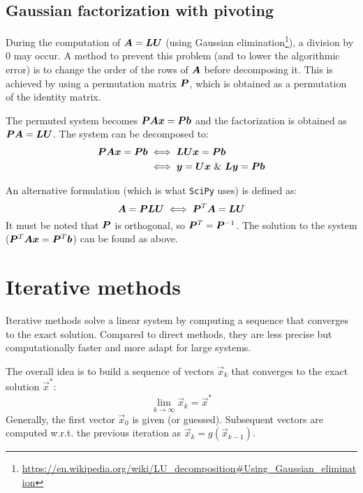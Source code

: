 \subsection{Gaussian factorization with pivoting}
During the computation of ${\bm{A}} = {\bm{L}}{\bm{U}}$ 
(using Gaussian elimination\footnote{\url{https://en.wikipedia.org/wiki/LU\_decomposition\#Using\_Gaussian\_elimination}}), 
a division by 0 may occur.
A method to prevent this problem (and to lower the algorithmic error) is to change the order of the rows of ${\bm{A}}$ before decomposing it.
This is achieved by using a permutation matrix ${\bm{P}}$, which is obtained as a permutation of the identity matrix.

The permuted system becomes ${\bm{P}}{\bm{A}}{\bm{x}} = {\bm{P}}{\bm{b}}$ and the factorization is obtained as ${\bm{P}}{\bm{A}} = {\bm{L}}{\bm{U}}$.
The system can be decomposed to:
\[
    \begin{split}
        {\bm{P}}{\bm{A}}{\bm{x}} = {\bm{P}}{\bm{b}} & \iff {\bm{L}}{\bm{U}}{\bm{x}} = {\bm{P}}{\bm{b}} \\
            & \iff {\bm{y}} = {\bm{U}}{\bm{x}} \text{ \& } {\bm{L}}{\bm{y}} = {\bm{P}}{\bm{b}}
    \end{split}
\]

An alternative formulation (which is what \texttt{SciPy} uses) 
is defined as:
\[{\bm{A}} = {\bm{P}}{\bm{L}}{\bm{U}} \iff {\bm{P}}^T{\bm{A}} = {\bm{L}}{\bm{U}} \]
It must be noted that ${\bm{P}}$ is orthogonal, so ${\bm{P}}^T = {\bm{P}}^{-1}$.
The solution to the system (${\bm{P}}^T{\bm{A}}{\bm{x}} = {\bm{P}}^T{\bm{b}}$) can be found as above.



\section{Iterative methods}
Iterative methods solve a linear system by computing a sequence that converges to the exact solution.
Compared to direct methods, they are less precise but computationally faster and more adapt for large systems. 

The overall idea is to build a sequence of vectors $\vec{x}_k$ 
that converges to the exact solution $\vec{x}^*$:
\[ \lim_{k \rightarrow \infty} \vec{x}_k = \vec{x}^* \]
Generally, the first vector $\vec{x}_0$ is given (or guessed). Subsequent vectors are computed w.r.t. the previous iteration 
as $\vec{x}_k = g(\vec{x}_{k-1})$.

